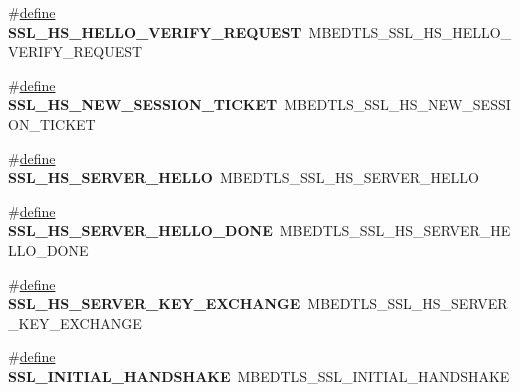 \begin{DoxyCompactItemize}
\item 
\mbox{\label{compat-1_83_8h_a63e0eb4bb8bc2b16e57605cd316c5649}} 
\#\hyperlink{structdefine}{define} {\bfseries S\+S\+L\+\_\+\+H\+S\+\_\+\+H\+E\+L\+L\+O\+\_\+\+V\+E\+R\+I\+F\+Y\+\_\+\+R\+E\+Q\+U\+E\+ST}~M\+B\+E\+D\+T\+L\+S\+\_\+\+S\+S\+L\+\_\+\+H\+S\+\_\+\+H\+E\+L\+L\+O\+\_\+\+V\+E\+R\+I\+F\+Y\+\_\+\+R\+E\+Q\+U\+E\+ST
\item 
\mbox{\label{compat-1_83_8h_a63adfe04136af9f3990b24562569d054}} 
\#\hyperlink{structdefine}{define} {\bfseries S\+S\+L\+\_\+\+H\+S\+\_\+\+N\+E\+W\+\_\+\+S\+E\+S\+S\+I\+O\+N\+\_\+\+T\+I\+C\+K\+ET}~M\+B\+E\+D\+T\+L\+S\+\_\+\+S\+S\+L\+\_\+\+H\+S\+\_\+\+N\+E\+W\+\_\+\+S\+E\+S\+S\+I\+O\+N\+\_\+\+T\+I\+C\+K\+ET
\item 
\mbox{\label{compat-1_83_8h_aad10d88b523225e34a788bb2553d2593}} 
\#\hyperlink{structdefine}{define} {\bfseries S\+S\+L\+\_\+\+H\+S\+\_\+\+S\+E\+R\+V\+E\+R\+\_\+\+H\+E\+L\+LO}~M\+B\+E\+D\+T\+L\+S\+\_\+\+S\+S\+L\+\_\+\+H\+S\+\_\+\+S\+E\+R\+V\+E\+R\+\_\+\+H\+E\+L\+LO
\item 
\mbox{\label{compat-1_83_8h_a56bb1fe1c001cd5905e26a7ad6cee303}} 
\#\hyperlink{structdefine}{define} {\bfseries S\+S\+L\+\_\+\+H\+S\+\_\+\+S\+E\+R\+V\+E\+R\+\_\+\+H\+E\+L\+L\+O\+\_\+\+D\+O\+NE}~M\+B\+E\+D\+T\+L\+S\+\_\+\+S\+S\+L\+\_\+\+H\+S\+\_\+\+S\+E\+R\+V\+E\+R\+\_\+\+H\+E\+L\+L\+O\+\_\+\+D\+O\+NE
\item 
\mbox{\label{compat-1_83_8h_ab9903e824d585f667a0018fa459dc30a}} 
\#\hyperlink{structdefine}{define} {\bfseries S\+S\+L\+\_\+\+H\+S\+\_\+\+S\+E\+R\+V\+E\+R\+\_\+\+K\+E\+Y\+\_\+\+E\+X\+C\+H\+A\+N\+GE}~M\+B\+E\+D\+T\+L\+S\+\_\+\+S\+S\+L\+\_\+\+H\+S\+\_\+\+S\+E\+R\+V\+E\+R\+\_\+\+K\+E\+Y\+\_\+\+E\+X\+C\+H\+A\+N\+GE
\item 
\mbox{\label{compat-1_83_8h_a3a22bcc5982f8f2dbbc899b2d9c09b0d}} 
\#\hyperlink{structdefine}{define} {\bfseries S\+S\+L\+\_\+\+I\+N\+I\+T\+I\+A\+L\+\_\+\+H\+A\+N\+D\+S\+H\+A\+KE}~M\+B\+E\+D\+T\+L\+S\+\_\+\+S\+S\+L\+\_\+\+I\+N\+I\+T\+I\+A\+L\+\_\+\+H\+A\+N\+D\+S\+H\+A\+KE
\item 
\mbox{\label{compat-1_83_8h_a7d3c4f57b35a1b8c395ebd7451e2211b}} 

\end{DoxyCompactItemize}
